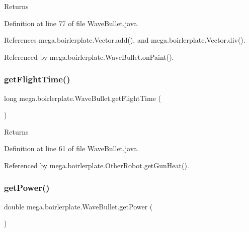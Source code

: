 \begin{DoxyReturn}{Returns}

\end{DoxyReturn}


Definition at line 77 of file Wave\+Bullet.\+java.



References mega.\+boirlerplate.\+Vector.\+add(), and mega.\+boirlerplate.\+Vector.\+div().



Referenced by mega.\+boirlerplate.\+Wave\+Bullet.\+on\+Paint().

\mbox{\label{classmega_1_1boirlerplate_1_1_wave_bullet_a5f1ba57af79ce9805f485f6a48f8dab5}} 
\subsubsection{\texorpdfstring{get\+Flight\+Time()}{getFlightTime()}}
{\footnotesize\ttfamily long mega.\+boirlerplate.\+Wave\+Bullet.\+get\+Flight\+Time (\begin{DoxyParamCaption}{ }\end{DoxyParamCaption})}

\begin{DoxyReturn}{Returns}

\end{DoxyReturn}


Definition at line 61 of file Wave\+Bullet.\+java.



Referenced by mega.\+boirlerplate.\+Other\+Robot.\+get\+Gun\+Heat().

\mbox{\label{classmega_1_1boirlerplate_1_1_wave_bullet_ae302b671d2642dff9d4ff65032b415e2}} 
\subsubsection{\texorpdfstring{get\+Power()}{getPower()}}
{\footnotesize\ttfamily double mega.\+boirlerplate.\+Wave\+Bullet.\+get\+Power (\begin{DoxyParamCaption}{ }\end{DoxyParamCaption})}

